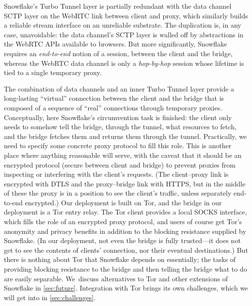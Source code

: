 \documentclass[letterpaper,twocolumn]{article}
\begin{document}
Snowflake's Turbo Tunnel layer
is partially redundant with the data channel SCTP layer
on the WebRTC link between client and proxy,
which similarly builds a reliable stream interface
on an unreliable substrate.
The duplication is, in any case, unavoidable:
the data channel's SCTP layer is walled off by abstractions
in the WebRTC APIs available to browsers.
But more significantly, Snowflake requires an
\emph{end-to-end} notion of a session,
between the client and the bridge,
whereas the WebRTC data channel is only a
\emph{hop-by-hop} session
whose lifetime is tied to a single temporary proxy.

The combination of data channels and an inner Turbo Tunnel layer
provide a long-lasting ``virtual'' connection between the client and the bridge
that is composed of a sequence of ``real'' connections through temporary proxies.
Conceptually, here Snowflake's circumvention task is finished:
the client only needs to somehow tell the bridge, through the tunnel,
what resources to fetch, and the bridge fetches them and returns them through the tunnel.
Practically, we need to specify some concrete proxy protocol to fill this role.
This is another place where anything reasonable will serve,
with the caveat that it should be an encrypted protocol
(secure between client and bridge) to prevent proxies
from inspecting or interfering with the client's requests.
(The client--proxy link is encrypted with DTLS
and the proxy--bridge link with HTTPS,
but in the middle of these the proxy is in a position to see
the client's traffic, unless separately end-to-end encrypted.)
Our deployment is built on Tor,
and the bridge in our deployment is a Tor entry relay.
The Tor client provides a local SOCKS interface,
which fills the role of an encrypted proxy protocol,
and users of course get Tor's anonymity and privacy benefits
in addition to the blocking resistance supplied by Snowflake.
(In our deployment, not even the bridge is fully trusted---it
does not get to see the contents of clients' connection,
nor their eventual destinations.)
But there is nothing about Tor that Snowflake depends on essentially;
the tasks of providing blocking resistance to the bridge
and then telling the bridge what to do are easily separable.
We~discuss alternatives to Tor
and other extensions of Snowflake in \autoref{sec:future}.
Integration with Tor brings its own challenges,
which we will get into in \autoref{sec:challenges}.
\end{document}
